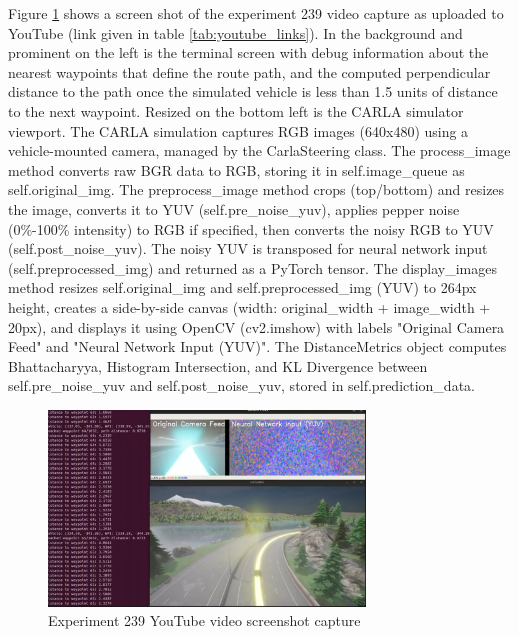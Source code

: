 Figure \ref{fig:Exp239-30pc-noise-CNN-5-bin-bal-youtube.png} shows a screen shot of the experiment 239 video capture as uploaded to YouTube (link given in table \ref{tab:youtube_links}). In the background and prominent on the left is the terminal screen with debug information about the nearest waypoints that define the route path, and the computed perpendicular distance to the path once the simulated vehicle is less than 1.5 units of distance to the next waypoint.
Resized on the bottom left is the CARLA simulator viewport.
The CARLA simulation captures RGB images (640x480) using a vehicle-mounted camera, managed by the CarlaSteering class. The process\_image method converts raw BGR data to RGB, storing it in self.image\_queue as self.original\_img. The preprocess\_image method crops (top/bottom) and resizes the image, converts it to YUV (self.pre\_noise\_yuv), applies pepper noise (0\%-100\% intensity) to RGB if specified, then converts the noisy RGB to YUV (self.post\_noise\_yuv). The noisy YUV is transposed for neural network input (self.preprocessed\_img) and returned as a PyTorch tensor. The display\_images method resizes self.original\_img and self.preprocessed\_img (YUV) to 264px height, creates a side-by-side canvas (width: original\_width + image\_width + 20px), and displays it using OpenCV (cv2.imshow) with labels "Original Camera Feed" and "Neural Network Input (YUV)". The DistanceMetrics object computes Bhattacharyya, Histogram Intersection, and KL Divergence between self.pre\_noise\_yuv and self.post\_noise\_yuv, stored in self.prediction\_data.

\begin{figure}[h]
    \centering
    \includegraphics[width=0.75\textwidth]{Figures/Results/Exp239-30pc-noise-CNN-5-bin-bal-youtube.png}
    \caption{Experiment 239 YouTube video screenshot capture}
    \label{fig:Exp239-30pc-noise-CNN-5-bin-bal-youtube.png}
\end{figure}


